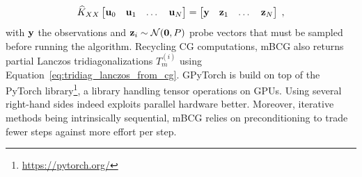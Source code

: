 \documentclass{article}
\begin{document}
\begin{equation*}
    \widehat K_{XX} \begin{bmatrix}
    \boldsymbol{\mathbf{u}}_0 & \boldsymbol{\mathbf{u}}_1 & \dots & \boldsymbol{\mathbf{u}}_N
    \end{bmatrix}
    = \begin{bmatrix}
    \boldsymbol{\mathbf{y}} & \boldsymbol{\mathbf{z}}_1 & \dots & \boldsymbol{\mathbf{z}}_N
    \end{bmatrix} \;,
\end{equation*}
%
with $\boldsymbol{\mathbf{y}}$ the observations and $\boldsymbol{\mathbf{z}}_i \sim \mathcal N(\boldsymbol{\mathbf{0}}, P)$ probe vectors that must be sampled before running the algorithm.
Recycling CG computations, mBCG also returns partial Lanczos tridiagonalizations $T_m^{(i)}$ using Equation~\ref{eq:tridiag_lanczos_from_cg}. 
GPyTorch is build on top of the PyTorch library\footnote{\url{https://pytorch.org/}}, a library handling tensor operations on GPUs. Using several right-hand sides indeed exploits parallel hardware better. Moreover, iterative methods being intrinsically sequential, mBCG relies on preconditioning to trade fewer steps against more effort per step. 
\end{document}
